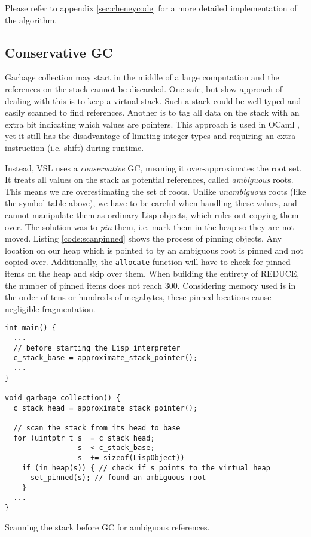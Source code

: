Please refer to appendix \ref{sec:cheneycode} for a more detailed implementation of the algorithm.

\subsection{Conservative GC}
\label{sec:conservativegc}

Garbage collection may start in the middle of a large computation and the references on the stack cannot be discarded.
One safe, but slow approach of dealing with this is to keep a virtual stack. Such a stack could be well typed and easily scanned to find
references. Another is to tag all data on the stack with an extra bit indicating which values are pointers. This approach
is used in OCaml \cite[Chapter~20]{rwoc}, yet it still has the disadvantage of limiting integer types and requiring an extra
instruction (i.e. shift) during runtime.

Instead, VSL uses a \emph{conservative} GC, meaning it over-approximates the root set.
It treats all values on the stack as potential references, called \emph{ambiguous} roots.
This means we are overestimating the set of roots. Unlike \emph{unambiguous} roots (like the symbol table above), we
have to be careful when handling these values, and cannot manipulate them as ordinary Lisp objects, which rules out
copying them over. The solution was
to \emph{pin} them, i.e. mark them in the heap so they are not moved. Listing \ref{code:scanpinned}
shows the process of pinning objects.
Any location on our heap which is pointed to by an ambiguous root is pinned and not copied over.
Additionally, the \texttt{allocate} function will have to check for pinned items on the heap and skip over them.
When building the entirety of REDUCE, the number of pinned items does not reach 300.
Considering memory used is in the order of tens or hundreds of megabytes,
these pinned locations cause negligible fragmentation.

\begin{code}
\begin{verbatim}
int main() {
  ...
  // before starting the Lisp interpreter
  c_stack_base = approximate_stack_pointer();
  ...
}

void garbage_collection() {
  c_stack_head = approximate_stack_pointer();

  // scan the stack from its head to base
  for (uintptr_t s  = c_stack_head;
                 s  < c_stack_base;
                 s  += sizeof(LispObject))
    if (in_heap(s)) { // check if s points to the virtual heap
      set_pinned(s); // found an ambiguous root
    }
  ...
}
\end{verbatim}
\caption{Scanning the stack before GC for ambiguous references.}
\label{code:scanpinned}
\end{code}

